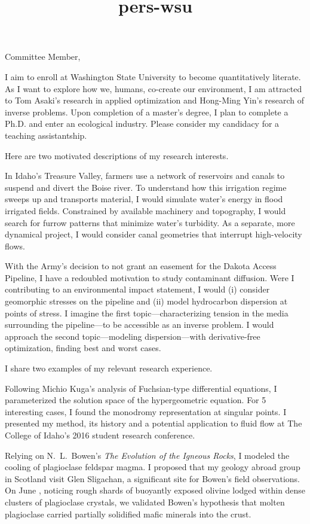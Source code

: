 \documentclass[10pt]{letter}
\date{}
\title{pers-wsu}
\newcommand{\topic}[1]{\textmd{#1}}
\begin{document}
\begin{letter}{
}
\opening{Committee Member,}
I aim to enroll at Washington State University to become quantitatively literate. As I want to explore how we, humans, co-create our environment, I am attracted to Tom Asaki's research in applied optimization and Hong-Ming Yin's research of inverse problems. Upon completion of a master's degree, I plan to complete a Ph.D. and enter an ecological industry. Please consider my candidacy for a teaching assistantship.

Here are two motivated descriptions of my research interests. 
\begin{description}[topsep=0pt]
	\item[Sediment Transport]
		In Idaho's Treasure Valley, farmers use a network of reservoirs and canals to suspend and divert the Boise river. To understand how this irrigation regime sweeps up and transports material, I would simulate water's energy in flood irrigated fields. Constrained by available machinery and topography, I would search for furrow patterns that minimize water's turbidity. As a separate, more dynamical project, I would consider canal geometries that interrupt high-velocity flows.
	\item[Ground Water Contamination]
		With the Army's decision to not grant an easement for the Dakota Access Pipeline, I have a redoubled motivation to study contaminant diffusion. Were I contributing to an environmental impact statement, I would (i) consider geomorphic stresses on the pipeline and (ii) model hydrocarbon dispersion at points of stress. I imagine the first topic---characterizing tension in the media surrounding the pipeline---to be accessible as an inverse problem. I would approach the second topic---modeling dispersion---with derivative-free optimization, finding best and worst cases.
\end{description}

I share two examples of my relevant research experience. 
\begin{description}[topsep=0pt]
    \item[Galois Theory \& Fuchsian Equations] 
    	Following Michio Kuga's analysis of Fuchsian-type differential equations, I parameterized the solution space of the hypergeometric equation. For 5 interesting cases, I found the monodromy representation at singular points. I presented my method, its history and a potential application to \topic{fluid flow} at The College of Idaho's 2016 student research conference.
    \item[Igneous Dikes in Scotland]
        Relying on N.~L.~Bowen's \emph{The Evolution of the Igneous Rocks}, I modeled the cooling of plagioclase feldspar magma. I proposed that my geology abroad group in Scotland visit Glen Sligachan, a significant site for Bowen's field observations. On June , noticing rough shards of buoyantly exposed olivine lodged within dense clusters of plagioclase crystals, we validated Bowen's hypothesis that molten plagioclase carried partially solidified mafic minerals into the crust. 
\end{description}


\end{letter}
\end{document}
